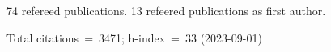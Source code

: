 74 refereed publications. 13 refeered publications as first author.

Total citations~=~3471; h-index~=~33 (2023-09-01)